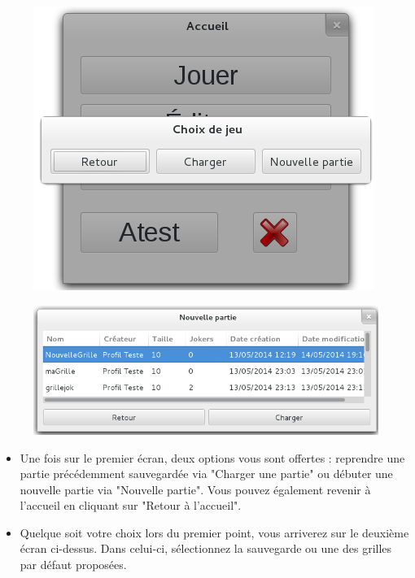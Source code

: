 \documentclass[a4paper, 12pt, twoside]{article}
\begin{document}
\begin{figure}[H]
  \center
  \includegraphics[scale=0.6]{choix_partie1.png}
  \label{accueil}
\end{figure}

\begin{figure}[H]
  \center
  \includegraphics[scale=0.6]{choix_partie2.png}
  \label{accueil}
\end{figure}

\begin{itemize}\setlength{\itemsep}{1mm}
 \item Une fois sur le premier écran, deux options vous sont offertes : reprendre une partie précédemment sauvegardée via "Charger une partie" ou débuter une nouvelle partie via "Nouvelle partie". Vous pouvez également revenir à l'accueil en cliquant sur "Retour à l'accueil".
 \item Quelque soit votre choix lors du premier point, vous arriverez sur le deuxième écran ci-dessus. Dans celui-ci, sélectionnez la sauvegarde ou une des grilles par défaut proposées.
\end{itemize}
\end{document}

